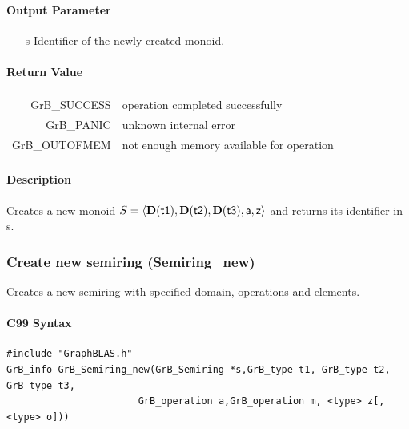 \documentclass[11pt]{extarticle}
\begin{document}
\paragraph{Output Parameter}

\begin{itemize}
	\item[{\sf s}] Identifier of the newly created monoid.
\end{itemize}

\paragraph{Return Value}

\begin{tabular}{rl} 
{\sf GrB\_SUCCESS} 	& operation completed successfully \\
{\sf GrB\_PANIC}	& unknown internal error \\
{\sf GrB\_OUTOFMEM}	& not enough memory available for operation \\
\end{tabular}

\paragraph{Description}

Creates a new monoid $S = \langle \bold{D}({\sf t1}), \bold{D}({\sf t2}), \bold{D}({\sf t3}), {\sf a}, {\sf z} \rangle$ and
returns its identifier in {\sf s}.


\subsubsection{Create new semiring ({\sf Semiring\_new})}

Creates a new semiring with specified domain, operations and elements.

\paragraph{C99 Syntax}

\begin{verbatim}
#include "GraphBLAS.h"
GrB_info GrB_Semiring_new(GrB_Semiring *s,GrB_type t1, GrB_type t2, GrB_type t3,
                       GrB_operation a,GrB_operation m, <type> z[, <type> o]))
\end{verbatim}

\end{document}
